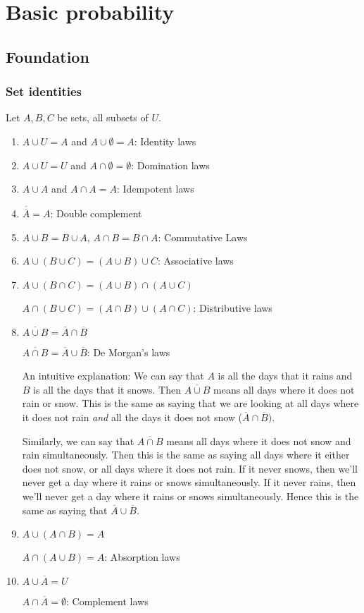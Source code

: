 

\chapter{Basic probability}

\section{Foundation}

\subsection{Set identities}
Let $A, B, C$ be sets, all subsets of $U$.
\begin{enumerate}
    \item $A \cup U = A$ and $A \cup \emptyset = A$: Identity laws
    \item $A \cup U = U$ and $A \cap \emptyset = \emptyset$: Domination laws
    \item $A \cup A$ and $A \cap A = A$: Idempotent laws
    \item $\overline{\overline{A}} = A$: Double complement
    \item $A \cup B = B \cup A$, $A \cap B = B \cap A$: Commutative Laws
    \item $A \cup (B \cup C) = (A \cup B) \cup C$: Associative laws
    \item $A \cup (B \cap C) = (A \cup B) \cap (A \cup C)$ 
    
    $A \cap (B \cup C) = (A \cap B) \cup (A \cap C)$: Distributive laws
    
    \item $\overline{A \cup B} = \overline{A} \cap \overline{B}$

    $\overline{A \cap B} = \overline{A} \cup \overline{B}$: De Morgan's laws

    An intuitive explanation: We can say that $A$ is all the days that it rains and $B$ is all the days that it snows. Then $\overline{A \cup B}$ means all days where it does not rain or snow. This is the same as saying that we are looking at all days where it does not rain \textit{and} all the days it does not snow ($\overline{A} \cap \overline{B})$.

    Similarly, we can say that $\overline{A \cap B}$ means all days where it does not snow and rain simultaneously. Then this is the same as saying all days where it either does not snow, or all days where it does not rain. If it never snows, then we'll never get a day where it rains or snows simultaneously. If it never rains, then we'll never get a day where it rains or snows simultaneously. Hence this is the same as saying that $\overline{A} \cup \overline{B}$.
    
    \item $A \cup (A \cap B) = A$

    $A \cap (A \cup B) = A$: Absorption laws

    \item $A \cup \overline{A} = U$

    $A \cap \overline{A} = \emptyset$: Complement laws
\end{enumerate}

